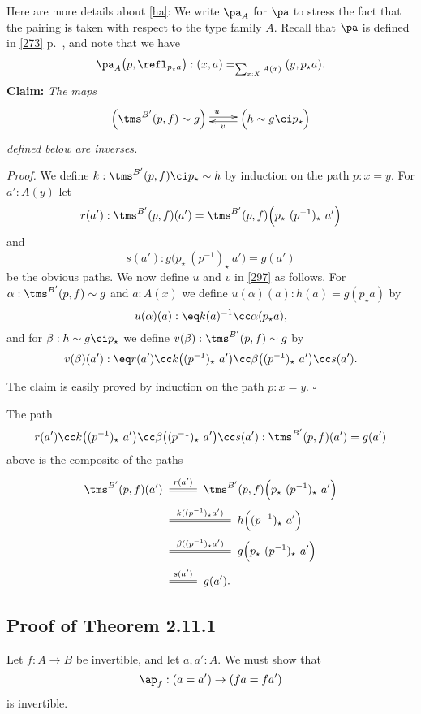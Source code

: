 \documentclass[12pt]{article}
\begin{document}
Here are more details about \eqref{ha}: We write $\pa_A$ for $\pa$ to stress the fact that the pairing is taken with respect to the type family $A$. Recall that $\pa$ is defined in \eqref{273} p.~\pageref{273}, and note that we have 
$$
\pa_A\big(p,\refl_{p_\star a}\big):(x,a)=_{\sum_{x:X}A(x)}(y,p_\star a).
$$
\textbf{Claim:} \emph{The maps}
\begin{equation}\label{297}
\xymatrix{
\Big(\tms^{B'}(p,f)\sim g\Big)\ar@<2pt>[r]^(.5)u&\Big(h\sim g\ci p_\star\Big)\ar@<2pt>[l]^(.45)v}
\end{equation}
\emph{defined below are inverses.}

\nn\emph{Proof.} We define $k:\tms^{B'}(p,f)\ci p_\star\sim h$ by induction on the path $p:x=y$. For $a':A(y)$ let 
$$
r(a'):\tms^{B'}(p,f)(a')=\tms^{B'}(p,f)\Big(p_\star\ (p^{-1})_\star\ a'\Big)
$$ 
and 
$$
s(a'):g\Big(p_\star\ (p^{-1})_\star\ a'\Big)=g(a')
$$ 
be the obvious paths. We now define $u$ and $v$ in \eqref{297} as follows. For $\alpha:\tms^{B'}(p,f)\sim g$ and $a:A(x)$ we define $u(\alpha)(a):h(a)=g(p_\star a)$ by 
$$ 
u(\alpha)(a):\eq k(a)^{-1}\cc\alpha(p_\star a), 
$$ 
and for $\beta:h\sim g\ci p_\star$ we define $v(\beta):\tms^{B'}(p,f)\sim g$ by 
$$
v(\beta)(a'):\eq r(a')\cc k\big((p^{-1})_\star\ a'\big)\cc\beta\big((p^{-1})_\star\ a'\big)\cc s(a').
$$ 

The claim is easily proved by induction on the path $p:x=y$. $\square$

The path 
$$
r(a')\cc k\big((p^{-1})_\star\ a'\big)\cc\beta\big((p^{-1})_\star\ a'\big)\cc s(a'):\tms^{B'}(p,f)(a')=g(a')
$$ 
above is the composite of the paths
\begin{align*}
\tms^{B'}(p,f)(a')&\xymatrix{\ar@1{=}[r]^{r(a')}&}\tms^{B'}(p,f)\Big(p_\star\ (p^{-1})_\star\ a'\Big)\\ 
&\xymatrix{\ar@1{=}[rr]^{k((p^{-1})_\star a')}&&}h\Big((p^{-1})_\star\ a'\Big)\\ 
&\xymatrix{\ar@1{=}[rr]^{\beta((p^{-1})_\star a')}&&}g\Big(p_\star\ (p^{-1})_\star\ a'\Big)\\ 
&\xymatrix{\ar@1{=}[r]^{s(a')}&}g(a').
\end{align*}


\subsection{Proof of Theorem 2.11.1}\label{2111}

Let $f:A\to B$ be invertible, and let $a,a':A$. We must show that 
$$
\ap_f:(a=a')\to (fa=fa')
$$ 
is invertible.
\end{document}
